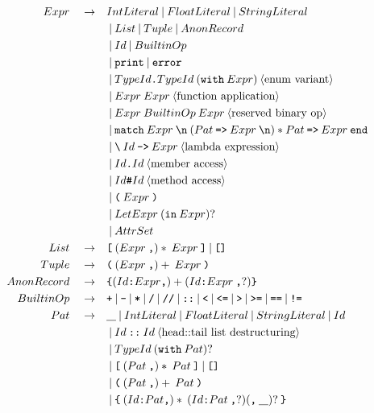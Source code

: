 \documentclass[a4paper, 12pt]{article}
\newcommand{\sepbar}{\: | \:}	%
\newcommand{\substo}{\quad\rightarrow\quad}
\newcommand{\uscore}{\underline{\hspace{0.3cm}}}
\renewcommand{\tt}{\texttt}
\newcommand{\la}{\langle}
\newcommand{\ra}{\rangle}
\begin{document}
\begin{align*}
Expr \substo& IntLiteral \sepbar FloatLiteral \sepbar StringLiteral\\
&\sepbar List \sepbar Tuple \sepbar AnonRecord\\
&\sepbar Id \sepbar BuiltinOp\\
&\sepbar \tt{print} \sepbar \tt{error}\\
&\sepbar TypeId\tt{.}TypeId \: (\tt{with} \: Expr) \: \la\text{enum variant}\ra \\
&\sepbar Expr \: Expr \: \la\text{function application}\ra \\
&\sepbar Expr \: BuiltinOp \: Expr \: \la\text{reserved binary op}\ra \\
&\sepbar \tt{match}\: Expr\: \tt{\symbol{92}n} \:(Pat \: \tt{=>} \: Expr\:\tt{\symbol{92}n})* Pat \: \tt{=>} \: Expr\:\tt{end}\\
&\sepbar \tt{\symbol{92}}\:Id\: \tt{->}\: Expr\:\la\text{lambda expression}\ra \\
&\sepbar Id\tt{.}Id \: \la\text{member access}\ra\\
&\sepbar Id\tt{\#}Id \: \la\text{method access}\ra\\
&\sepbar \tt{(}\: Expr \: \tt{)}\\
&\sepbar LetExpr \: (\tt{in}\: Expr)?\\
&\sepbar AttrSet\\
List \substo& \tt{[}\: (Expr \: \tt{,})*\: Expr\: \tt{]} \sepbar \tt{[]}\\
Tuple \substo& \tt{(}\: (Expr \: \tt{,})+\: Expr\: \tt{)}\\
AnonRecord \substo& \tt{\{} (Id\tt{:} Expr\tt{,})+ (Id\tt{:} Expr\: \tt{,}?) \tt{\}}\\
BuiltinOp \substo& \tt{+}\sepbar\tt{-}\sepbar\tt{*}\sepbar\tt{/}\sepbar\tt{//}\sepbar\tt{::}\sepbar\tt{<}\sepbar\tt{<=}\sepbar\tt{>}\sepbar\tt{>=}\sepbar\tt{==}\sepbar\tt{!=}\\
Pat \substo& \uscore \sepbar IntLiteral\sepbar FloatLiteral\sepbar StringLiteral\sepbar Id \\
& \sepbar Id\:\tt{::}\: Id\:\la\text{head::tail list destructuring}\ra\\
& \sepbar TypeId \: (\tt{with}\: Pat)?\\
& \sepbar \tt{[} \: ( Pat\:\tt{,})*\: Pat \: \tt{]} \sepbar  \tt{[]}\\
& \sepbar \tt{(} \: ( Pat\:\tt{,})+\: Pat\: \tt{)}\\
& \sepbar \tt{\{} \: (Id\tt{:}Pat\tt{,})*\: (Id\tt{:}Pat\: \tt{,}?) (\tt{,}\:\uscore)?\: \tt{\}}\\

\end{align*}
\end{document}
